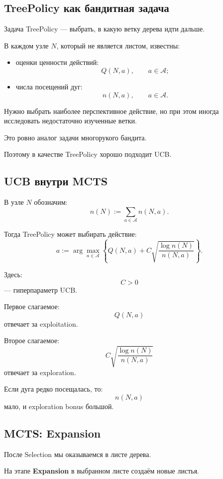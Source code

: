 \documentclass[12pt,a4paper]{article}
\begin{document}
\subsection{TreePolicy как бандитная задача}

Задача TreePolicy --- выбрать, в какую ветку дерева идти дальше.

В каждом узле $N$, который не является листом, известны:

\begin{itemize}
    \item оценки ценности действий:
    \[
    Q(N,a),
    \qquad
    a\in\mathcal A;
    \]

    \item числа посещений дуг:
    \[
    n(N,a),
    \qquad
    a\in\mathcal A.
    \]
\end{itemize}

Нужно выбрать наиболее перспективное действие, но при этом иногда исследовать недостаточно изученные ветки.

Это ровно аналог задачи многорукого бандита.

Поэтому в качестве TreePolicy хорошо подходит UCB.

\subsection{UCB внутри MCTS}

В узле $N$ обозначим:
\[
n(N)
:=
\sum_{a\in\mathcal A}
n(N,a).
\]

Тогда TreePolicy может выбирать действие:
\[
a
:=
\arg\max_{a\in\mathcal A}
\left\{
Q(N,a)
+
C
\sqrt{
\frac{\log n(N)}{n(N,a)}
}
\right\}.
\]

Здесь:
\[
C>0
\]
--- гиперпараметр UCB.

Первое слагаемое:
\[
Q(N,a)
\]
отвечает за exploitation.

Второе слагаемое:
\[
C
\sqrt{
\frac{\log n(N)}{n(N,a)}
}
\]
отвечает за exploration.

Если дуга редко посещалась, то:
\[
n(N,a)
\]
мало, и exploration bonus большой.

\subsection{MCTS: Expansion}

После Selection мы оказываемся в листе дерева.

На этапе \textbf{Expansion} в выбранном листе создаём новые листья.
\end{document}
